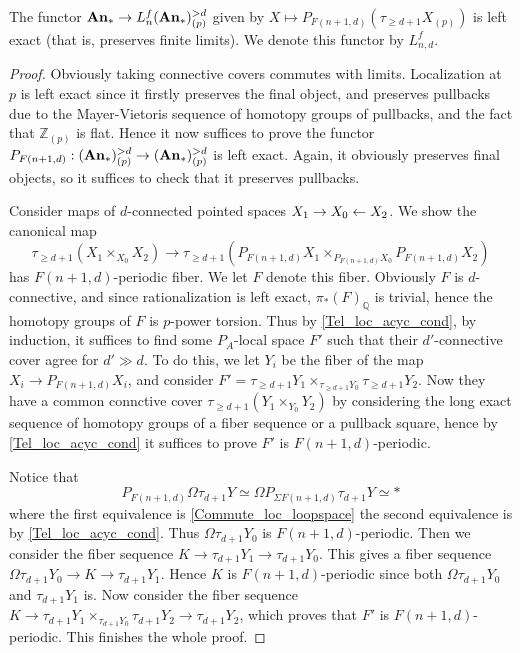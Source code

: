 	\begin{prop}\label{Tel_loc_fin_lim}
		The functor $\mathbf{An}_*\to L_n^f(\mathbf{An}_*)_{(p)}^{>d}$ given by $X\mapsto P_{F(n+1,d)}(\tau_{\geq d+1}X_{(p)})$ is left exact (that is, preserves finite limits). We denote this functor by $L_{n,d}^f$. 
	\end{prop}
	\begin{proof}
		Obviously taking connective covers commutes with limits. Localization at $p$ is left exact since it firstly preserves the final object, and preserves pullbacks due to the Mayer-Vietoris sequence of homotopy groups of pullbacks, and the fact that $\mathbb{Z}_{(p)}$ is flat. Hence it now suffices to prove the functor $P_{F(n+1,d)}:(\mathbf{An}_*)_{(p)}^{>d}\to(\mathbf{An}_*)_{(p)}^{>d}$ is left exact. Again, it obviously preserves final objects, so it suffices to check that it preserves pullbacks. 

		Consider maps of $d$-connected pointed spaces $X_1\to X_0\leftarrow X_2$. We show the canonical map 
		\[ \tau_{\geq d+1}(X_1\times_{X_0}X_2)\to\tau_{\geq d+1}(P_{F(n+1,d)}X_1\times_{P_{F(n+1,d)}X_0}P_{F(n+1,d)}X_2) \]
		has $F(n+1,d)$-periodic fiber. We let $F$ denote this fiber. Obviously $F$ is $d$-connective, and since rationalization is left exact, $\pi_*(F)_\mathbb{Q}$ is trivial, hence the homotopy groups of $F$ is $p$-power torsion. Thus by \cref{Tel_loc_acyc_cond}, by induction, it suffices to find some $P_A$-local space $F'$ such that their $d'$-connective cover agree for $d'\gg d$. To do this, we let $Y_i$ be the fiber of the map $X_i\to P_{F(n+1,d)}X_i$, and consider $F'=\tau_{\geq d+1}Y_1\times_{\tau_{\geq d+1}Y_0}\tau_{\geq d+1}Y_2$. Now they have a common connctive cover $\tau_{\geq d+1}(Y_1\times_{Y_0}Y_2)$ by considering the long exact sequence of homotopy groups of a fiber sequence or a pullback square, hence by \cref{Tel_loc_acyc_cond} it suffices to prove $F'$ is $F(n+1,d)$-periodic. 

		Notice that 
		\[ P_{F(n+1,d)}\Omega\tau_{d+1}Y\simeq\Omega P_{\Sigma F(n+1,d)}\tau_{d+1}Y\simeq * \]
		where the first equivalence is \cref{Commute_loc_loopspace} the second equivalence is by \cref{Tel_loc_acyc_cond}. Thus $\Omega\tau_{d+1}Y_0$ is $F(n+1,d)$-periodic. Then we consider the fiber sequence $K\to\tau_{d+1}Y_1\to\tau_{d+1}Y_0$. This gives a fiber sequence $\Omega\tau_{d+1}Y_0\to K\to\tau_{d+1}Y_1$. Hence $K$ is $F(n+1,d)$-periodic since both $\Omega\tau_{d+1}Y_0$ and $\tau_{d+1}Y_1$ is. Now consider the fiber sequence $K\to\tau_{d+1}Y_1\times_{\tau_{d+1}Y_0}\tau_{d+1}Y_2\to\tau_{d+1}Y_2$, which proves that $F'$ is $F(n+1,d)$-periodic. This finishes the whole proof. 
	\end{proof}

